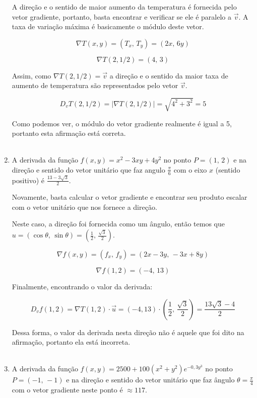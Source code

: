 \begin{enumerate}
	A direção e o sentido de maior aumento da temperatura é fornecida pelo vetor gradiente,
	portanto, basta encontrar e verificar se ele é paralelo a $\vec{v}$. A taxa de variação
	máxima é basicamente o módulo deste vetor.
	
	$$
	\nabla T(x, y) = \left( T_x, \, T_y\right) =
	\left( 2x, \, 6y\right)	
	$$
	
	$$
	\nabla T(2, 1/2) = \left( 4, \, 3\right)
	$$
	
	Assim, como $\nabla T(2, 1/2) = \vec{v}$ a direção e o sentido da maior taxa
	de aumento de temperatura são representados pelo vetor $\vec{v}$.
	
	$$
	D_v T(2, 1/2) = |\nabla T(2, 1/2)| = \sqrt{4^2 + 3^2} = 5
	$$
	
	Como podemos ver, o módulo do vetor gradiente realmente é igual a 5, portanto
	esta afirmação está correta.
	\\ \\
	\item A derivada da função $f(x, y) = x^2 -3xy +4y^2$ no ponto $P = (1, \, 2)$
	e na direção e sentido do vetor unitário que faz angulo $\frac{\pi}{6}$ com o eixo
	$x$ (sentido positivo) é $\frac{13 - 3 \sqrt{3}}{2}$.
	
	\solucao
	
	Novamente, basta calcular o vetor gradiente e encontrar seu produto escalar
	com o vetor unitário que nos fornece a direção.
	
	Neste caso, a direção foi fornecida como um ângulo, então temos que
	$u = (\cos \theta, \, \sin \theta) = \left( \frac{1}{2}, \, \frac{\sqrt{3}}{2}\right)$.
	
	$$
	\nabla f(x, y) = \left( f_x, \, f_y\right) =
	\left( 2x - 3y, \, -3x + 8y\right)	
	$$

	$$
	\nabla f(1, 2) = \left( -4, \, 13\right)
	$$
	
	Finalmente, encontrando o valor da derivada:
	
	$$
	D_v f(1, 2) = \nabla T(1, 2) \cdot \vec{u} =
	(-4, 13) \cdot \left( \frac{1}{2}, \, \frac{\sqrt{3}}{2}\right) =
	\frac{13\sqrt{3} - 4}{2}
	$$
	
	Dessa forma, o valor da derivada nesta direção não é aquele que foi dito
	na afirmação, portanto ela está incorreta.
	\\ \\
	\item  A derivada da função $f(x, y) = 2500 + 100(x^2 + y^2) e^{-0,3y^3}$ no ponto
	$P = (-1, \, -1)$ e na direção e sentido do vetor unitário que faz ângulo $\theta = 
	\frac{\pi}{4}$ com o vetor gradiente neste ponto é $\approx 117$.
	

\end{enumerate}
